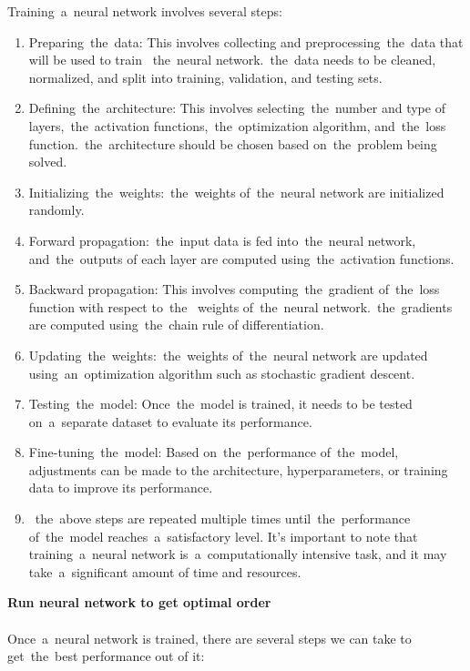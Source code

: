         Training~a~neural network involves several steps:
        \begin{enumerate}
            \item Preparing~the~data: This involves collecting and preprocessing~the~data that will be used to train
           ~the~neural network.~the~data needs to be cleaned, normalized, and split into training, validation, and
            testing sets.
            \item Defining~the~architecture: This involves selecting~the~number and type of layers,~the~activation
            functions,~the~optimization algorithm, and~the~loss function.~the~architecture should be chosen
            based on~the~problem being solved.
            \item Initializing~the~weights:~the~weights of~the~neural network are initialized randomly.
            \item Forward propagation:~the~input data is fed into~the~neural network, and~the~outputs of each layer are
            computed using~the~activation functions.
            \item Backward propagation: This involves computing~the~gradient of~the~loss function with respect to~the~
            weights of~the~neural network.~the~gradients are computed using~the~chain rule of differentiation.
            \item Updating~the~weights:~the~weights of~the~neural network are updated using~an~optimization algorithm
            such as stochastic gradient descent.
            \item Testing~the~model: Once~the~model is trained, it needs to be tested on~a~separate dataset to
            evaluate its performance.
            \item Fine-tuning~the~model: Based on~the~performance of~the~model, adjustments can be made to the
            architecture, hyperparameters, or training data to improve its performance.
            \item~the~above steps are repeated multiple times until~the~performance of~the~model
            reaches~a~satisfactory level. It's important to note that training~a~neural network is~a~computationally
            intensive task, and it may take~a~significant amount of time and resources.
        \end{enumerate}
        \textbf{Run neural network to get optimal order}\\
        \\
        Once~a~neural network is trained, there are several steps we can take to get~the~best performance out of it:
